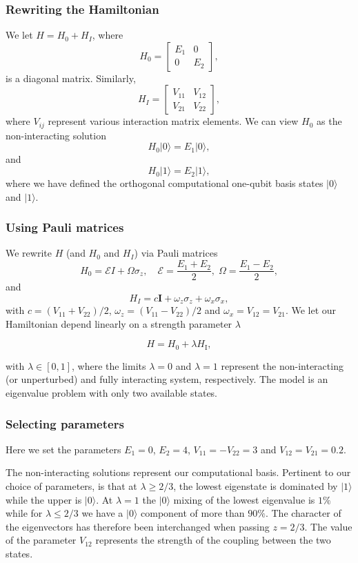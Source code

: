 \documentclass{beamer}
\begin{document}
\begin{frame}
\frametitle{Rewriting the Hamiltonian}

We  let $H = H_0 + H_I$, where
\[
H_0= \begin{bmatrix} E_1 & 0 \\ 0 & E_2\end{bmatrix},
\]
is a diagonal matrix. Similarly,
\[
H_I= \begin{bmatrix} V_{11} & V_{12} \\ V_{21} & V_{22}\end{bmatrix},
\]
where $V_{ij}$ represent various interaction matrix elements.
We can view $H_0$ as the non-interacting solution
\begin{equation}
       H_0\vert 0 \rangle =E_1\vert 0 \rangle,
\end{equation}
and
\begin{equation}
       H_0\vert 1\rangle =E_2\vert 1\rangle,
\end{equation}
where we have defined the orthogonal computational one-qubit basis states $\vert 0\rangle$ and $\vert 1\rangle$.
\end{frame}

\begin{frame}
\frametitle{Using Pauli matrices}

We rewrite $H$ (and $H_0$ and $H_I$)  via Pauli matrices
\[
H_0 = \mathcal{E} I + \Omega \sigma_z, \quad \mathcal{E} = \frac{E_1
  + E_2}{2}, \; \Omega = \frac{E_1-E_2}{2},
\]
and
\[
H_I = c \bm{I} +\omega_z\sigma_z + \omega_x\sigma_x,
\]
with $c = (V_{11}+V_{22})/2$, $\omega_z = (V_{11}-V_{22})/2$ and $\omega_x = V_{12}=V_{21}$.
We let our Hamiltonian depend linearly on a strength parameter $\lambda$

\[
H=H_0+\lambda H_\mathrm{I},
\]

with $\lambda \in [0,1]$, where the limits $\lambda=0$ and $\lambda=1$
represent the non-interacting (or unperturbed) and fully interacting
system, respectively.  The model is an eigenvalue problem with only
two available states.
\end{frame}

\begin{frame}
\frametitle{Selecting parameters}

Here we set the parameters $E_1=0$,
$E_2=4$, $V_{11}=-V_{22}=3$ and $V_{12}=V_{21}=0.2$.

The non-interacting solutions represent our computational basis.
Pertinent to our choice of parameters, is that at $\lambda\geq 2/3$,
the lowest eigenstate is dominated by $\vert 1\rangle$ while the upper
is $\vert 0 \rangle$. At $\lambda=1$ the $\vert 0 \rangle$ mixing of
the lowest eigenvalue is $1\%$ while for $\lambda\leq 2/3$ we have a
$\vert 0 \rangle$ component of more than $90\%$.  The character of the
eigenvectors has therefore been interchanged when passing $z=2/3$. The
value of the parameter $V_{12}$ represents the strength of the coupling
between the two states.
\end{frame}
\end{document}
